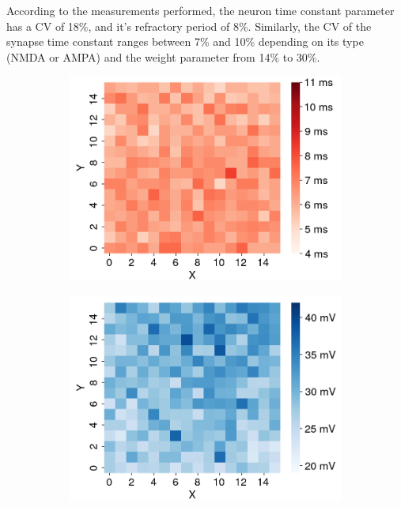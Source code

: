 According to the measurements performed, the neuron time constant parameter has a CV of 18\%, and it's refractory period of 8\%.
Similarly, the CV of the synapse time constant ranges between 7\% and 10\% depending on its type (NMDA or AMPA) and the weight parameter from 14\% to 30\%.

\begin{figure}[h]
\centering
  \begin{subfigure}{.32\textwidth}
  \centering
    \includegraphics[width=\textwidth]{img/chapter4/rfr_spatial_distribution.png}
    \subcaption{}
    \label{fig:tau_ref_spatial_dist}
  \end{subfigure}
    \begin{subfigure}{.32\textwidth}
    \centering
    \includegraphics[width=\textwidth]{img/chapter4/wgt_spatial_distribution.png}

\end{subfigure}
\end{figure}

